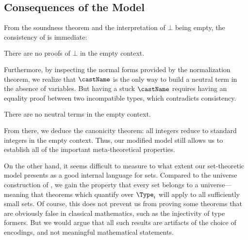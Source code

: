\subsection{Consequences of the Model}

From the soundness theorem and the interpretation of \( \bot \) being empty,
the consistency of \SetoidCC is immediate:

\begin{theorem}[Consistency]
  There are no proofs of \( \bot \) in the empty context.
\end{theorem}

Furthermore, by inspecting the normal forms provided by the normalization
theorem, we realize that \( \castName \) is the only way to build a neutral
term in the absence of variables. But having a stuck \( \castName \) requires
having an equality proof between two incompatible types, which contradicts
consistency.

\begin{theorem}
  There are no neutral terms in the empty context.
\end{theorem}

From there, we deduce the canonicity theorem: all integers reduce to
standard integers in the empty context. Thus, our modified model still allows
us to establish all of the important meta-theoretical properties.

On the other hand, it seems difficult to measure to what extent our
set-theoretic model presents
\SetoidCC as a good internal language for sets. Compared to the universe
construction of , we gain the property that every set belongs
to a universe---meaning that theorems which quantify over \( \Type_i \)
will apply to all sufficiently small sets.
%
Of course, this does not prevent us from proving some theorems that are
obviously false in classical mathematics, such as the
injectivity of type formers. But we would argue that all such results
are artifacts of the choice of encodings, and not meaningful
mathematical statements.

